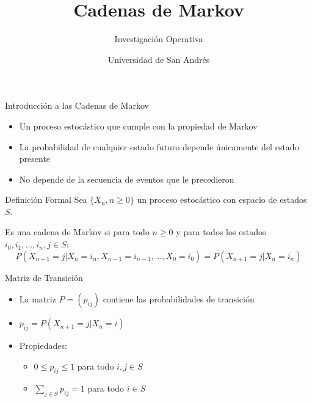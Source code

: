 \documentclass{beamer}
\title{\Huge\textbf{Cadenas de Markov}}
\subtitle{\large Investigación Operativa}
\author{Universidad de San Andrés}
\date{}
\begin{document}
\begin{frame}
    \titlepage
\end{frame}

\begin{frame}{Introducción a las Cadenas de Markov}
    \begin{itemize}
        \item<1-> Un proceso estocástico que cumple con la propiedad de Markov
        \item<2-> La probabilidad de cualquier estado futuro depende únicamente del estado presente
        \item<3-> No depende de la secuencia de eventos que le precedieron
    \end{itemize}
\end{frame}

\begin{frame}{Definición Formal}
    Sea $\{X_n, n \geq 0\}$ un proceso estocástico con espacio de estados $S$.
    
    Es una cadena de Markov si para todo $n \geq 0$ y para todos los estados $i_0, i_1, ..., i_n, j \in S$:
    \[P(X_{n+1} = j | X_n = i_n, X_{n-1} = i_{n-1}, ..., X_0 = i_0) = P(X_{n+1} = j | X_n = i_n)\]
\end{frame}

\begin{frame}{Matriz de Transición}
    \begin{itemize}
        \item La matriz $P = (p_{ij})$ contiene las probabilidades de transición
        \item $p_{ij} = P(X_{n+1} = j | X_n = i)$
        \item<+-> Propiedades:
        \begin{itemize}
            \item $0 \leq p_{ij} \leq 1$ para todo $i,j \in S$
            \item $\sum_{j \in S} p_{ij} = 1$ para todo $i \in S$
        \end{itemize}
    \end{itemize}
\end{frame}
\end{document}
